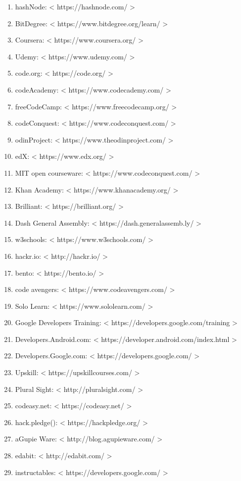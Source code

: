 \documentclass[12pt,a4paper]{article} %
\begin{document}
\begin{enumerate}
\item hashNode: < https://hashnode.com/ >
\item BitDegree: < https://www.bitdegree.org/learn/ >
\item Coursera: < https://www.coursera.org/ >
\item Udemy: < https://www.udemy.com/ >
\item code.org: < https://code.org/ >
\item codeAcademy: < https://www.codecademy.com/ >
\item freeCodeCamp: < https://www.freecodecamp.org/ >
\item codeConquest: < https://www.codeconquest.com/ >
\item odinProject: < https://www.theodinproject.com/ >
\item edX: < https://www.edx.org/ >
\item MIT open courseware: < https://www.codeconquest.com/ >
\item Khan Academy: < https://www.khanacademy.org/ >
\item Brilliant: < https://brilliant.org/ >
\item Dash General Assembly: < https://dash.generalassemb.ly/ >
\item w3schools: < https://www.w3schools.com/ >
\item hackr.io: < http://hackr.io/ >
\item bento: < https://bento.io/ >
\item code avengers: < https://www.codeavengers.com/ >
\item Solo Learn: < https://www.sololearn.com/ >
\item Google Developers Training: < https://developers.google.com/training >
\item Developers.Android.com: < https://developer.android.com/index.html >
\item Developers.Google.com: < https://developers.google.com/ >
\item Upskill: < https://upskillcourses.com/ >
\item Plural Sight: < http://pluralsight.com/ >
\item codeasy.net: < https://codeasy.net/ >
\item hack.pledge(): < https://hackpledge.org/ >
\item aGupie Ware: < http://blog.agupieware.com/ >
\item edabit: < http://edabit.com/ >
\item instructables: < https://developers.google.com/ >

\end{enumerate}
\end{document}
